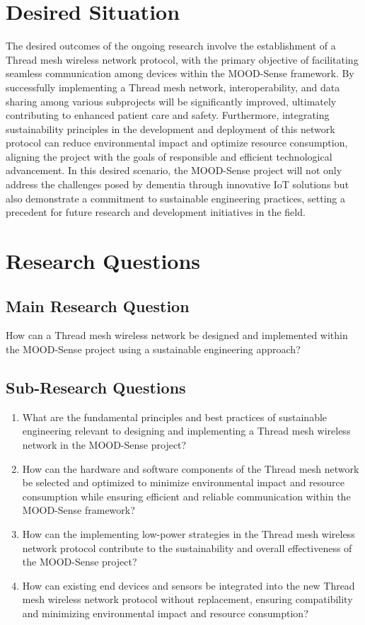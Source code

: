 \section{Desired Situation}

The desired outcomes of the ongoing research involve the establishment of a Thread mesh wireless network protocol, with the primary objective of facilitating seamless communication among devices within the MOOD-Sense framework. By successfully implementing a Thread mesh network, interoperability, and data sharing among various subprojects will be significantly improved, ultimately contributing to enhanced patient care and safety. Furthermore, integrating sustainability principles in the development and deployment of this network protocol can reduce environmental impact and optimize resource consumption, aligning the project with the goals of responsible and efficient technological advancement. In this desired scenario, the MOOD-Sense project will not only address the challenges posed by dementia through innovative IoT solutions but also demonstrate a commitment to sustainable engineering practices, setting a precedent for future research and development initiatives in the field.


\section{Research Questions}

\subsection*{Main Research Question}

How can a Thread mesh wireless network be designed and implemented within the MOOD-Sense project using a sustainable engineering approach?

\subsection*{Sub-Research Questions}

\begin{enumerate}
    \item What are the fundamental principles and best practices of sustainable engineering relevant to designing and implementing a Thread mesh wireless network in the MOOD-Sense project?
    \item How can the hardware and software components of the Thread mesh network be selected and optimized to minimize environmental impact and resource consumption while ensuring efficient and reliable communication within the MOOD-Sense framework?
    \item How can the implementing low-power strategies in the Thread mesh wireless network protocol contribute to the sustainability and overall effectiveness of the MOOD-Sense project?
    \item How can existing end devices and sensors be integrated into the new Thread mesh wireless network protocol without replacement, ensuring compatibility and minimizing environmental impact and resource consumption?
\end{enumerate}
